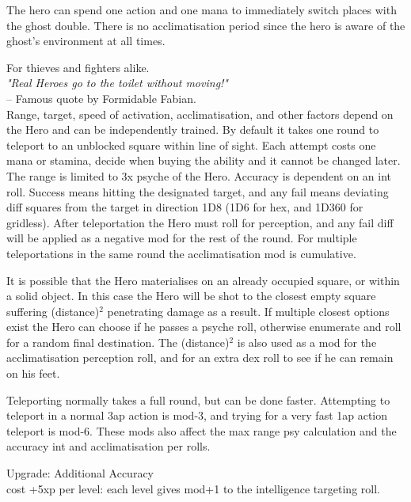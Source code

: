 The hero can spend one action and one mana to immediately switch places with the ghost double. There is no acclimatisation period since the hero is aware of the ghost's environment at all times.


 For thieves and fighters alike.\\
\emph{"Real Heroes go to the toilet without moving!"}\\
-- Famous quote by Formidable Fabian.\\
Range, target, speed of activation, acclimatisation, and other factors depend on the Hero and can be independently trained. By default it takes one round to teleport to an unblocked square within line of sight. Each attempt costs one mana or stamina, decide when buying the ability and it cannot be changed later. The range is limited to 3x psyche of the Hero. Accuracy is dependent on an int roll. Success means hitting the designated target, and any fail means deviating diff squares from the target in direction 1D8 (1D6 for hex, and 1D360 for gridless). After teleportation the Hero must roll for perception, and any fail diff will be applied as a negative mod for the rest of the round. For multiple teleportations in the same round the acclimatisation mod is cumulative.

It is possible that the Hero materialises on an already occupied square, or within a solid object. In this case the Hero will be shot to the closest empty square suffering (distance)$^2$ penetrating damage as a result. If multiple closest options exist the Hero can choose if he passes a psyche roll, otherwise enumerate and roll for a random final destination. The (distance)$^2$ is also used as a mod for the acclimatisation perception roll, and for an extra dex roll to see if he can remain on his feet.

Teleporting normally takes a full round, but can be done faster. Attempting to teleport in a normal 3ap action is mod-3, and trying for a very fast 1ap action teleport is mod-6. These mods also affect the max range psy calculation and the accuracy int and acclimatisation per rolls. %

Upgrade: Additional Accuracy\\
cost +5xp per level: each level gives mod+1 to the intelligence targeting roll.

